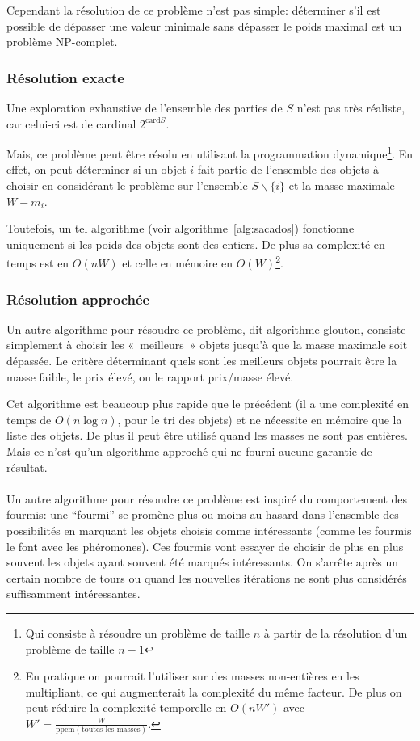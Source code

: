     Cependant la résolution de ce problème n'est pas simple: déterminer s'il
    est possible de dépasser une valeur minimale sans dépasser le poids maximal
    est un problème NP\nobreakdash-complet.

  \subsubsection{Résolution exacte}
    Une exploration exhaustive de l'ensemble des parties de $S$ n'est pas très
    réaliste, car celui-ci est de cardinal $2^{\mathrm{card} S}$.

    Mais, ce problème peut être résolu en utilisant la programmation
    dynamique\footnote{Qui consiste à résoudre un problème de taille $n$ à
    partir de la résolution d'un problème de taille $n-1$}. En effet, on peut
    déterminer si un objet $i$ fait partie de l'ensemble des objets à choisir en
    considérant le problème sur l'ensemble $S\backslash\{i\}$ et la masse
    maximale $W-m_i$.
    
    Toutefois, un tel algorithme (voir algorithme~\ref{alg:sacados}) fonctionne
    uniquement si les poids des objets
    sont des entiers. De plus sa complexité en temps est en $O(nW)$ et celle en
    mémoire en $O(W)$\footnote{En pratique on pourrait l'utiliser sur des
    masses non-entières en les multipliant, ce qui augmenterait la complexité
    du même facteur. De plus on peut réduire la complexité temporelle en
    $O(nW')$ avec $W' = \frac W {\mathrm{ppcm}(\text{toutes les masses})}$.}.

  \subsubsection{Résolution approchée}
    Un autre algorithme pour résoudre ce problème, dit algorithme glouton,
    consiste simplement à choisir les «~meilleurs~» objets jusqu'à que la masse
    maximale soit dépassée. Le critère déterminant quels sont les meilleurs
    objets pourrait être la masse faible, le prix élevé, ou le rapport
    prix/masse élevé.

    Cet algorithme est beaucoup plus rapide que le précédent (il a une
    complexité en temps de $O(n \log n)$, pour le tri des objets) et ne
    nécessite en mémoire que la liste des objets. De plus il peut être utilisé
    quand les masses ne sont pas entières. Mais ce n'est qu'un algorithme
    approché qui ne fourni aucune garantie de résultat.


    \paragraph{}
    Un autre algorithme pour résoudre ce problème est inspiré du comportement
    des fourmis: une ``fourmi'' se promène plus ou moins au hasard dans
    l'ensemble des possibilités en marquant les objets choisis comme
    intéressants (comme les fourmis le font avec les phéromones). Ces fourmis
    vont essayer de choisir de plus en plus souvent les objets ayant souvent
    été marqués intéressants. On s'arrête après un certain nombre de tours ou
    quand les nouvelles itérations ne sont plus considérés suffisamment
    intéressantes.

